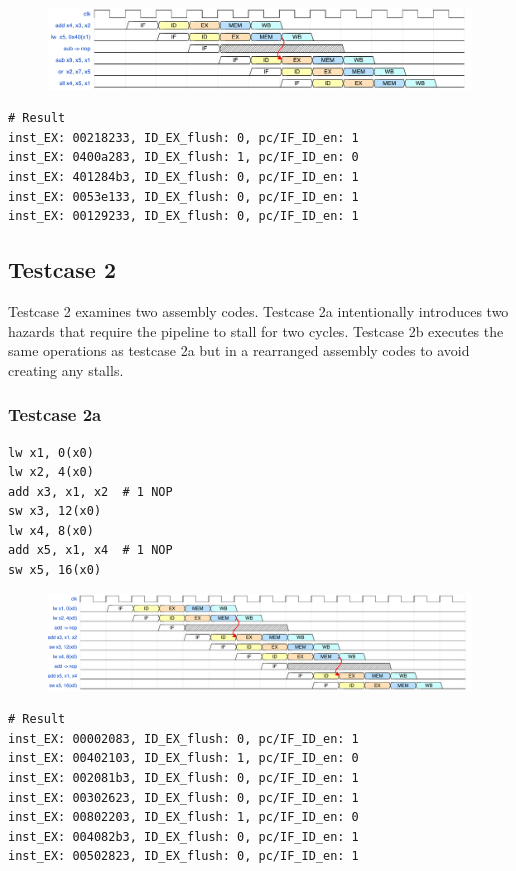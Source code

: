 \documentclass[12pt,a4paper,oneside]{book} %
\begin{document}
\begin{figure}[H]
    \centering
    \includegraphics[scale=0.58]{images/tb/hd_case1.pdf}
\end{figure}

\begin{verbatim}
# Result
inst_EX: 00218233, ID_EX_flush: 0, pc/IF_ID_en: 1
inst_EX: 0400a283, ID_EX_flush: 1, pc/IF_ID_en: 0
inst_EX: 401284b3, ID_EX_flush: 0, pc/IF_ID_en: 1
inst_EX: 0053e133, ID_EX_flush: 0, pc/IF_ID_en: 1
inst_EX: 00129233, ID_EX_flush: 0, pc/IF_ID_en: 1
\end{verbatim}

\subsection{Testcase 2}
Testcase 2 examines two assembly codes. Testcase 2a intentionally introduces two hazards that require the pipeline to stall for two cycles. Testcase 2b executes the same operations as testcase 2a but in a rearranged assembly codes to avoid creating any stalls.

\subsubsection*{Testcase 2a}
\begin{verbatim}
lw x1, 0(x0)
lw x2, 4(x0)
add x3, x1, x2  # 1 NOP
sw x3, 12(x0)
lw x4, 8(x0)
add x5, x1, x4  # 1 NOP
sw x5, 16(x0)
\end{verbatim}

\begin{figure}[H]
    \centering
    \includegraphics[scale=0.525]{images/tb/hd_case2.pdf}
\end{figure}

\begin{verbatim}
# Result
inst_EX: 00002083, ID_EX_flush: 0, pc/IF_ID_en: 1
inst_EX: 00402103, ID_EX_flush: 1, pc/IF_ID_en: 0
inst_EX: 002081b3, ID_EX_flush: 0, pc/IF_ID_en: 1
inst_EX: 00302623, ID_EX_flush: 0, pc/IF_ID_en: 1
inst_EX: 00802203, ID_EX_flush: 1, pc/IF_ID_en: 0
inst_EX: 004082b3, ID_EX_flush: 0, pc/IF_ID_en: 1
inst_EX: 00502823, ID_EX_flush: 0, pc/IF_ID_en: 1
\end{verbatim}
\end{document}
